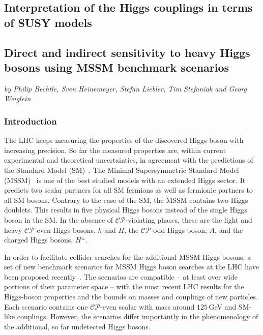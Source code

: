 \documentclass[../report.tex]{subfiles}
\begin{document}
\subsection{Interpretation of the Higgs couplings in terms of SUSY models}

\subsection{Direct and indirect sensitivity to heavy Higgs bosons using MSSM benchmark scenarios}
\begin{center}
\textit{by Philip Bechtle, Sven Heinemeyer, Stefan Liebler, Tim Stefaniak and Georg Weiglein}
\end{center}

\subsubsection*{Introduction}

The LHC keeps measuring the properties of the discovered Higgs boson with increasing precision. So far the measured properties are, within current experimental and theoretical uncertainties, in agreement with the predictions of the Standard Model (SM)~\cite{Khachatryan:2016vau}. The Minimal Supersymmetric Standard Model (MSSM)~\cite{Nilles:1983ge,Haber:1984rc,Gunion:1984yn} is one of the best studied models with an extended Higgs sector. It predicts two scalar partners for all SM fermions as well as fermionic partners to all SM bosons. Contrary to the case of the SM, the MSSM contains two Higgs doublets.
This results in five physical Higgs bosons instead of the single Higgs boson in the SM. In the absence of $\mathcal{CP}$-violating phases, these are the light and heavy $\mathcal{CP}$-even Higgs bosons,  
$h$ and $H$, the $\mathcal{CP}$-odd Higgs boson, $A$, and the charged Higgs bosons, $H^\pm$.

In order to facilitate collider searches for the additional MSSM Higgs bosons, a set of new benchmark scenarios for MSSM Higgs boson searches at the LHC have been proposed recently~\cite{Bahl:2018zmf}. The scenarios are compatible -- at least over wide portions
of their parameter space -- with the most recent LHC results for the
Higgs-boson properties and the bounds on masses and couplings of new
particles. Each scenario contains one $\mathcal{CP}$-even scalar with mass around $125$\,GeV and SM-like couplings. However, the scenarios differ importantly in the phenomenology of the additional, so far undetected Higgs bosons.
\end{document}
